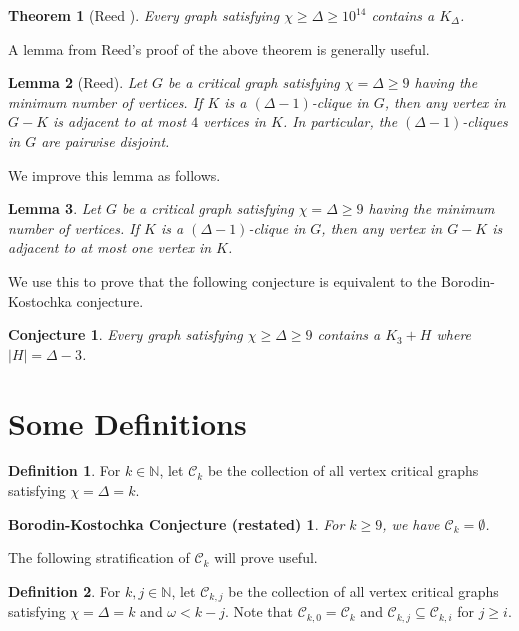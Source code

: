 \documentclass[12pt]{article}
\theoremstyle{plain}
\newtheorem{thm}{Theorem}[section]
\newtheorem{lem}[thm]{Lemma}
\newtheorem*{BK2}{Borodin-Kostochka Conjecture (restated)}
\newtheorem*{conjecture}{Conjecture}
\theoremstyle{definition}
\newtheorem{defn}{Definition}[section]
\theoremstyle{remark}
\newcommand{\fancy}[1]{\mathcal{#1}}
\newcommand{\C}[1]{\fancy{C}_{#1}}
\newcommand{\IN}{\mathbb{N}}
\begin{document}
\begin{thm}[Reed \cite{reed1999strengthening}]\label{ReedBK}
Every graph satisfying $\chi \geq \Delta \geq 10^{14}$ contains a $K_\Delta$.
\end{thm}

A lemma from Reed's proof of the above theorem is generally useful.

\begin{lem}[Reed]
Let $G$ be a critical graph satisfying $\chi = \Delta \geq 9$ having the minimum number of vertices.  If $K$ is a $(\Delta - 1)$-clique in $G$, then any vertex in $G - K$ is adjacent to at most $4$ vertices in $K$.  In particular, the $(\Delta - 1)$-cliques in $G$ are pairwise disjoint.
\end{lem}

We improve this lemma as follows.

\begin{lem}\label{OneOneEdgeIn}
Let $G$ be a critical graph satisfying $\chi = \Delta \geq 9$ having the minimum number of vertices.  If $K$ is a $(\Delta - 1)$-clique in $G$, then any vertex in $G - K$ is adjacent to at most one vertex in $K$.  
\end{lem}

We use this to prove that the following conjecture is equivalent to the Borodin-Kostochka conjecture.

\begin{conjecture}
Every graph satisfying $\chi \geq \Delta \geq 9$ contains a $K_3 + H$ where $|H| = \Delta - 3$.
\end{conjecture}

\section{Some Definitions}
\begin{defn}
For $k \in \IN$, let $\C{k}$ be the collection of all vertex critical graphs satisfying $\chi = \Delta = k$.
\end{defn}

\begin{BK2}
For $k \geq 9$, we have $\C{k} = \emptyset$.
\end{BK2}

The following stratification of $\C{k}$ will prove useful.

\begin{defn}
For $k, j \in \IN$, let $\C{k, j}$ be the collection of all vertex critical graphs satisfying $\chi = \Delta = k$ and $\omega < k - j$.  Note that $\C{k, 0} = \C{k}$ and $\C{k, j} \subseteq \C{k, i}$ for $j \geq i$.
\end{defn}
\end{document}
